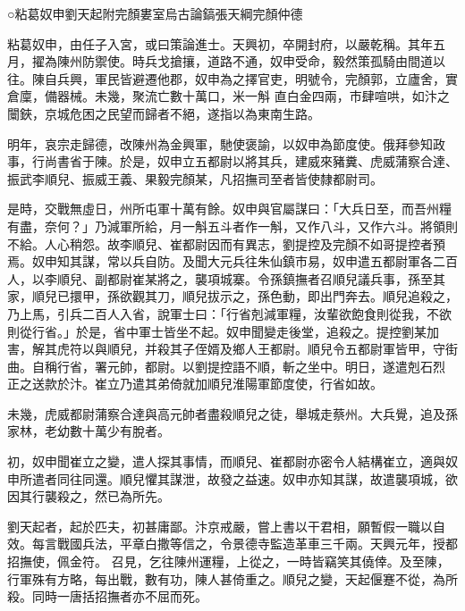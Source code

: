 
\begin{pinyinscope}

 ○粘葛奴申劉天起附完顏婁室烏古論鎬張天綱完顏仲德



 粘葛奴申，由任子入宮，或曰策論進士。天興初，卒開封府，以嚴乾稱。其年五月，擢為陳州防禦使。時兵戈搶攘，道路不通，奴申受命，毅然策孤騎由間道以往。陳自兵興，軍民皆避遷他郡，奴申為之擇官吏，明號令，完顏郭，立廬舍，實倉廩，備器械。未幾，聚流亡數十萬口，米一斛
 直白金四兩，市肆喧哄，如汴之闤鋏，京城危困之民望而歸者不絕，遂指以為東南生路。



 明年，哀宗走歸德，改陳州為金興軍，馳使褒諭，以奴申為節度使。俄拜參知政事，行尚書省于陳。於是，奴申立五都尉以將其兵，建威來豬糞、虎威蒲察合達、振武李順兒、振威王義、果毅完顏某，凡招撫司至者皆使隸都尉司。



 是時，交戰無虛日，州所屯軍十萬有餘。奴申與官屬謀曰：「大兵日至，而吾州糧有盡，奈何？」乃減軍所給，月一斛五斗者作一斛，又作八斗，又作六斗。將領則不給。人心稍怨。故李順兒、崔都尉因而有異志，劉提控及完顏不如哥提控者預
 焉。奴申知其謀，常以兵自防。及聞大元兵往朱仙鎮市易，奴申遣五都尉軍各二百人，以李順兒、副都尉崔某將之，襲項城寨。令孫鎮撫者召順兒議兵事，孫至其家，順兒已擐甲，孫欲觀其刀，順兒拔示之，孫色動，即出門奔去。順兒追殺之，乃上馬，引兵二百人入省，說軍士曰：「行省剋減軍糧，汝輩欲飽食則從我，不欲則從行省。」於是，省中軍士皆坐不起。奴申聞變走後堂，追殺之。提控劉某加害，解其虎符以與順兒，并殺其子侄婿及鄉人王都尉。順兒令五都尉軍皆甲，守街曲。自稱行省，署元帥，都尉。以劉提控語不順，斬之坐中。明日，遂遣剋石烈
 正之送款於汴。崔立乃遣其弟倚就加順兒淮陽軍節度使，行省如故。



 未幾，虎威都尉蒲察合達與高元帥者盡殺順兒之徒，舉城走蔡州。大兵覺，追及孫家林，老幼數十萬少有脫者。



 初，奴申聞崔立之變，遣人探其事情，而順兒、崔都尉亦密令人結構崔立，適與奴申所遣者同往同還。順兒懼其謀泄，故發之益速。奴申亦知其謀，故遣襲項城，欲因其行襲殺之，然已為所先。



 劉天起者，起於匹夫，初甚庸鄙。汴京戒嚴，嘗上書以干君相，願暫假一職以自效。每言戰國兵法，平章白撒等信之，令景德寺監造革車三千兩。天興元年，授都招撫使，佩金符。
 召見，乞往陳州運糧，上從之，一時皆竊笑其僥倖。及至陳，行軍殊有方略，每出戰，數有功，陳人甚倚重之。順兒之變，天起偃蹇不從，為所殺。同時一唐括招撫者亦不屈而死。




\end{pinyinscope}

